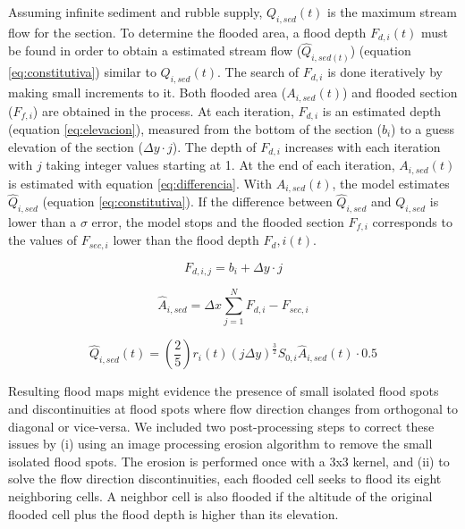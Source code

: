 \documentclass[hess, manuscript]{copernicus}
\begin{document}
Assuming infinite sediment and rubble supply, $Q_{i,sed}(t)$ is the maximum stream flow for the section.  To determine the flooded area, a flood depth $F_{d,i}(t)$ must be found in order to obtain a estimated stream flow ($\hat{Q}_{{i,sed}(t)}$) (equation \ref{eq:constitutiva}) similar to $Q_{i,sed}(t)$.  The search of $F_{d,i}$ is done iteratively by making small increments to it.  Both flooded area ($A_{i,sed}(t)$) and flooded section ($F_{f,i}$) are obtained in the process.  At each iteration, $F_{d,i}$ is an estimated depth (equation \ref{eq:elevacion}), measured from the bottom of the section ($b_i$) to a guess elevation of the section ($\Delta y \cdot j$).  The depth of $F_{d,i}$ increases with each iteration with $j$ taking integer values starting at 1.  At the end of each iteration, $A_{i,sed}(t)$ is estimated with equation \ref{eq:differencia}. With $A_{i,sed}(t)$, the model estimates $\hat{Q}_{i,sed}$ (equation \ref{eq:constitutiva}).  If the difference between $\hat{Q}_{i,sed}$ and $Q_{i,sed}$ is lower than a $\sigma$ error, the model stops and the flooded section $F_{f,i}$ corresponds to the values of $F_{sec,i}$ lower than the flood depth $F_d,i (t)$.
 
 \begin{equation}
     F_{d,i,j} = b_i + \Delta y \cdot j
     \label{eq:elevacion}
 \end{equation}
 
 \begin{equation}
  \hat{A}_{i,sed} = \Delta x \sum_{j=1}^{N} F_{d,i} - F_{sec,i} 
  \label{eq:differencia}
 \end{equation}
 
 \begin{equation}
   \hat{Q}_{i,sed}(t) = \left( \frac{2}{5} \right) r_i(t)(j \Delta y)^{\frac{3}{2}} S_{0,i} \hat{A}_{i,sed}(t) \cdot 0.5
 \label{eq:constitutiva} 
 \end{equation}

Resulting flood maps might evidence the presence of small isolated flood spots and discontinuities at flood spots where flow direction changes from orthogonal to diagonal or vice-versa.  We included two post-processing steps to correct these issues by  (i) using an image processing erosion algorithm \citep{Serra1983} to remove the small isolated flood spots. The erosion is performed once with a 3x3 kernel, and (ii) to solve the flow direction discontinuities, each flooded cell seeks to flood its eight neighboring cells.  A neighbor cell is also flooded if the altitude of the original flooded cell plus the flood depth is higher than its elevation.
\end{document}
